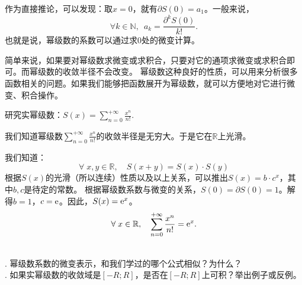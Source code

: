 \documentclass[12pt,UTF8]{ctexbook}
\begin{document}
作为直接推论，可以发现：取$x=0$，就有$\partial S(0) = a_1$。一般来说，
$$\forall k\in \mathbb{N}, \,\,\, a_k = \frac{\partial^k S(0)}{k!}.$$
也就是说，幂级数的系数可以通过求$0$处的微变计算。

简单来说，如果要对幂级数求微变或求积合，只要对它的通项求微变或求积合即可。而幂级数的收敛半径不会改变。
幂级数这种良好的性质，可以用来分析很多函数相关的问题。如果我们能够把函数展开为幂级数，就可以方便地对它进行微变、积合操作。

\begin{et}
    研究实幂级数：$S(x) = \sum_{n=0}^{+\infty} \frac{x^n}{n!}. $
\end{et}

\begin{so}
    我们知道幂级数$\sum_{n=0}^{+\infty} \frac{x^n}{n!}$的收敛半径是无穷大。于是它在$\mathbb{R}$上光滑。

    我们知道：
    $$ \forall \; x, y \in \mathbb{R}, \quad S(x + y) = S(x)\cdot S(y) $$
    根据$S(x)$的光滑（所以连续）性质以及以上关系，可以推出$S(x) = b\cdot c^x$，其中$b,c$是待定的常数。
    根据幂级数系数与微变的关系，$S(0) = \partial S(0) = 1$。解得$b=1$，$c=\mathrm{e}$。因此，$S(x) = \mathrm{e}^x$。
    $$ \forall \;x\in\mathbb{R}, \quad \sum_{n=0}^{+\infty} \frac{x^n}{n!} = \mathrm{e}^x. $$
\end{so}


\begin{sk}
    \mbox{} \\
    . 幂级数系数的微变表示，和我们学过的哪个公式相似？为什么？\\
    . 如果实幂级数的收敛域是$[-R;R]$，是否在$[-R;R]$上可积？举出例子或反例。
\end{sk}
\end{document}

